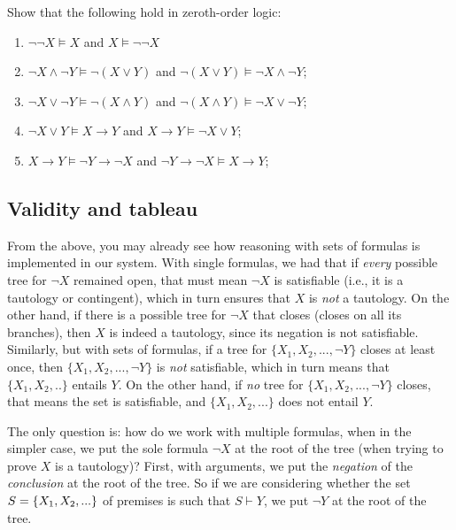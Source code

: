 \begin{exc}
Show that the following hold in zeroth-order logic:
%
	\begin{enumerate}
		\item $\neg \neg X \models X$ and $X \models \neg \neg X$
		\item $\neg X \wedge \neg Y \models \neg(X \vee Y)$ and $\neg (X \vee Y) \models \neg X \wedge \neg Y$;
		\item $\neg X \vee \neg Y \models \neg(X \wedge Y)$ and $\neg (X \wedge Y) \models \neg X \vee \neg Y$;
		\item $\neg X \vee Y \models X \rightarrow Y$ and $X \rightarrow Y \models \neg X \vee Y$;
		\item $X \rightarrow Y \models \neg Y \rightarrow \neg X$ and $\neg Y \rightarrow \neg X \models X \rightarrow Y$;
	\end{enumerate}
\end{exc}

\subsection{Validity and tableau}

From the above, you may already see how reasoning with sets of formulas is implemented in our system. With single formulas, we had that if \textit{every} possible tree for $\neg X$ remained open, that must mean $\neg X$ is satisfiable (i.e., it is a tautology or contingent), which in turn ensures that $X$ is \textit{not} a tautology. On the other hand, if there is a possible tree for $\neg X$ that closes (closes on all its branches), then $X$ is indeed a tautology, since its negation is not satisfiable. Similarly, but with sets of formulas, if a tree for $\{X_1, X_2, ..., \neg Y\}$ closes at least once, then $\{X_1, X_2, ..., \neg Y\}$ is \textit{not} satisfiable, which in turn means that $\{X_1, X_2, ..\}$ entails $Y$. On the other hand, if \textit{no} tree for $\{X_1, X_2, ..., \neg Y\}$ closes, that means the set is satisfiable, and $\{X_1, X_2, ...\}$ does not entail $Y$. 

The only question is: how do we work with multiple formulas, when in the simpler case, we put the sole formula $\neg X$ at the root of the tree (when trying to prove $X$ is a tautology)? First, with arguments, we put the \textit{negation} of the \textit{conclusion} at the root of the tree. So if we are considering whether the set $S=\{X_1, X_2, ...\}$ of premises is such that $S \vdash Y$, we put $\neg Y$ at the root of the tree. 

